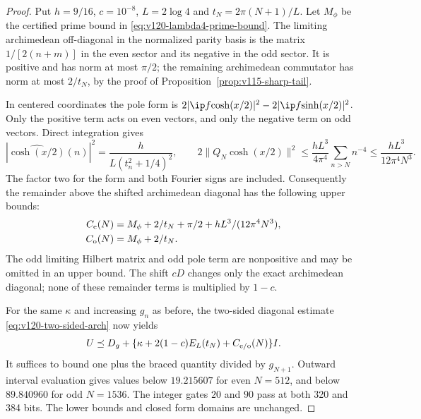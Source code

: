 \begin{proof}
Put $h=9/16$, $c=10^{-8}$, $L=2\log4$ and
$t_N=2\pi(N+1)/L$. Let $M_\phi$ be the certified prime bound
in \eqref{eq:v120-lambda4-prime-bound}. The limiting archimedean
off-diagonal in the normalized parity basis is the matrix
$1/[2(n+m)]$ in the even sector and its negative in the odd sector.
It is positive and has norm at most $\pi/2$; the remaining
archimedean commutator has norm at most $2/t_N$, by the proof of
Proposition~\ref{prop:v115-sharp-tail}.

In centered coordinates the pole form is
$2|\ip f{\cosh(x/2)}|^2-2|\ip f{\sinh(x/2)}|^2$.
Only the positive term acts on even vectors, and only the negative
term on odd vectors. Direct integration gives
\[
 |\widehat{\cosh(x/2)}(n)|^2
 =\frac{h}{L(t_n^2+1/4)^2},\qquad
 2\|Q_N\cosh(x/2)\|^2
 \le\frac{hL^3}{4\pi^4}\sum_{n>N}n^{-4}
 \le\frac{hL^3}{12\pi^4N^3}.
\]
The factor two for the form and both Fourier signs are included.
Consequently the remainder above the shifted archimedean diagonal
has the following upper bounds:
\begin{equation}\label{eq:v122-parity-upper}
 \begin{split}
 C_{\rm e}(N)&=M_\phi+2/t_N+\pi/2+hL^3/(12\pi^4N^3),\\
 C_{\rm o}(N)&=M_\phi+2/t_N.
 \end{split}
\end{equation}
The odd limiting Hilbert matrix and odd pole term are nonpositive
and may be omitted in an upper bound. The shift $cD$ changes only
the exact archimedean diagonal; none of these remainder terms is
multiplied by $1-c$.

For the same $\kappa$ and increasing $g_n$ as before, the two-sided
diagonal estimate \eqref{eq:v120-two-sided-arch} now yields
\[
 U\preceq D_g+
 \{\kappa+2(1-c)E_L(t_N)+C_{\rm e/o}(N)\}I.
\]
It suffices to bound one plus the braced quantity divided by
$g_{N+1}$. Outward interval evaluation gives values below
$19.215607$ for even $N=512$, and below $89.840960$ for odd
$N=1536$. The integer gates $20$ and $90$ pass at both 320 and
384 bits. The lower bounds and closed form domains are unchanged.
\end{proof}

